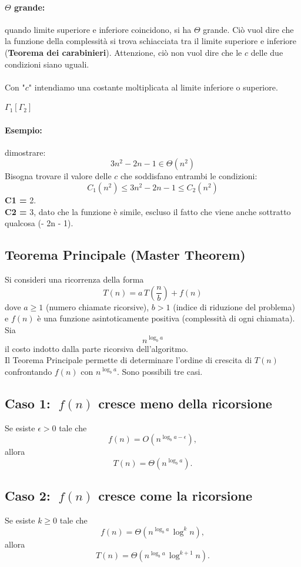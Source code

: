 \documentclass[a4paper,12pt]{article}
\begin{document}
\paragraph{$\Theta$ grande: } quando limite superiore e inferiore coincidono, si ha $\Theta$ grande. Ciò vuol dire che la funzione della complessità si trova schiacciata tra il limite superiore e inferiore (\textbf{Teorema dei carabinieri}). Attenzione, ciò non vuol dire che le $c$ delle due condizioni siano uguali.\\\\
Con "$c$" intendiamo una costante moltiplicata al limite inferiore o superiore.

$\Gamma_1[\Gamma_2]$

\paragraph{Esempio: } dimostrare:
\[
3n^2 - 2n - 1 \in \Theta(n^2)
\]
Bisogna trovare il valore delle $c$ che soddisfano entrambi le condizioni:
\[
C_1 (n^2) \le 3n^2 - 2n - 1 \le C_2 (n^2)
\]
\textbf{C1 = } 2.\\
\textbf{C2 = } 3, dato che la funzione è simile, escluso il fatto che viene anche sottratto qualcosa (- 2n - 1).

\subsection{Teorema Principale (Master Theorem)}

Si consideri una ricorrenza della forma
\[
T(n) = a\,T\!\left(\frac{n}{b}\right) + f(n)
\]
dove $a \ge 1$ (numero chiamate ricorsive), $b > 1$ (indice di riduzione del problema) e $f(n)$ è una funzione asintoticamente positiva (complessità di ogni chiamata).
Sia
\[
n^{\log_b a}
\]
il costo indotto dalla parte ricorsiva dell'algoritmo.\\
Il Teorema Principale permette di determinare l'ordine di crescita di $T(n)$
confrontando $f(n)$ con $n^{\log_b a}$. Sono possibili tre casi.

\subsection{Caso 1: $\;f(n)$ cresce meno della ricorsione}
Se esiste $\epsilon > 0$ tale che
\[
f(n) = O\!\left(n^{\log_b a - \epsilon}\right),
\]
allora
\[
T(n) = \Theta\!\left(n^{\log_b a}\right).
\]

\subsection{Caso 2: $\;f(n)$ cresce come la ricorsione}
Se esiste $k \ge 0$ tale che
\[
f(n) = \Theta\!\left(n^{\log_b a}\,\log^{k} n\right),
\]
allora
\[
T(n) = \Theta\!\left(n^{\log_b a}\,\log^{k+1} n\right).
\]
\end{document}
